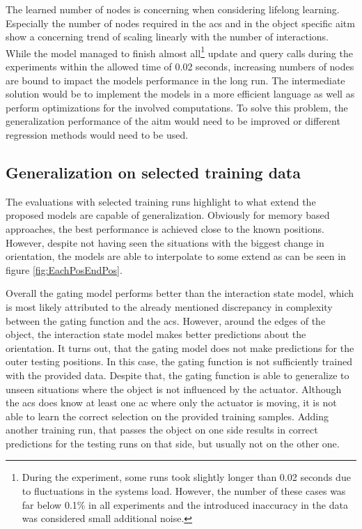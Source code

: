 The learned number of nodes is concerning when considering lifelong learning. Especially the number of nodes required in the \gls{acs} and in the object specific \gls{aitm} show a concerning trend of scaling linearly with the number of interactions.
While the model managed to finish almost all\footnote{During the experiment, some runs took slightly longer than 0.02 seconds due to fluctuations in the systems load. However, the number of these cases was far below 0.1\% in all experiments and the introduced inaccuracy in the data was considered small additional noise. } update and query calls during the experiments within the allowed time of 0.02 seconds, increasing numbers of nodes are bound to impact the models performance in the long run. The intermediate solution would be to implement the models in a more efficient language as well as perform optimizations for the involved computations. To solve this problem, the generalization performance of the \gls{aitm} would need to be improved or different regression methods would need to be used. 

\subsection{Generalization on selected training data}

The evaluations with selected training runs highlight to what extend the proposed models are capable of generalization. Obviously for memory based approaches, the best performance is achieved close to the known positions. However, despite not having seen the situations with the biggest change in orientation, the models are able to interpolate to some extend as can be seen in figure \ref{fig:EachPosEndPos}.

Overall the gating model performs better than the interaction state model, which is most likely attributed to the already mentioned discrepancy in complexity between the gating function and the \gls{acs}. 
However, around the edges of the object, the interaction state model makes better predictions about the orientation. It turns out, that the gating model does not make predictions for the outer testing positions. In this case, the gating function is not sufficiently trained with the provided data.
Despite that, the gating function is able to generalize to unseen situations where the object is not influenced by the actuator. Although the \gls{acs} does know at least one \gls{ac} where only the actuator is moving, it is not able to learn the correct selection on the provided training samples.
Adding another training run, that passes the object on one side results in correct predictions for the testing runs on that side, but usually not on the other one.

